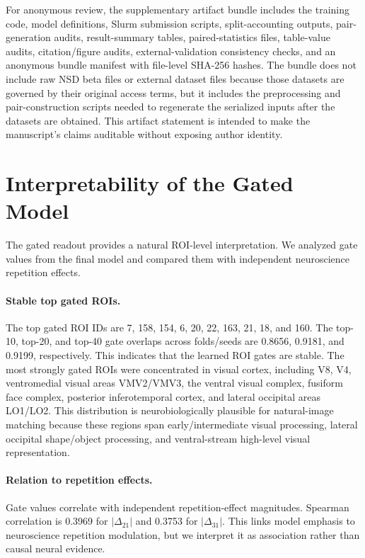 \documentclass{article}
\begin{document}
For anonymous review, the supplementary artifact bundle includes the training code, model definitions, Slurm submission scripts, split-accounting outputs, pair-generation audits, result-summary tables, paired-statistics files, table-value audits, citation/figure audits, external-validation consistency checks, and an anonymous bundle manifest with file-level SHA-256 hashes. The bundle does not include raw NSD beta files or external dataset files because those datasets are governed by their original access terms, but it includes the preprocessing and pair-construction scripts needed to regenerate the serialized inputs after the datasets are obtained. This artifact statement is intended to make the manuscript's claims auditable without exposing author identity.

\section{Interpretability of the Gated Model}

The gated readout provides a natural ROI-level interpretation. We analyzed gate values from the final model and compared them with independent neuroscience repetition effects.

\paragraph{Stable top gated ROIs.}
The top gated ROI IDs are 7, 158, 154, 6, 20, 22, 163, 21, 18, and 160. The top-10, top-20, and top-40 gate overlaps across folds/seeds are 0.8656, 0.9181, and 0.9199, respectively. This indicates that the learned ROI gates are stable. The most strongly gated ROIs were concentrated in visual cortex, including V8, V4, ventromedial visual areas VMV2/VMV3, the ventral visual complex, fusiform face complex, posterior inferotemporal cortex, and lateral occipital areas LO1/LO2. This distribution is neurobiologically plausible for natural-image matching because these regions span early/intermediate visual processing, lateral occipital shape/object processing, and ventral-stream high-level visual representation.

\paragraph{Relation to repetition effects.}
Gate values correlate with independent repetition-effect magnitudes. Spearman correlation is 0.3969 for $|\Delta_{21}|$ and 0.3753 for $|\Delta_{31}|$. This links model emphasis to neuroscience repetition modulation, but we interpret it as association rather than causal neural evidence.
\end{document}
